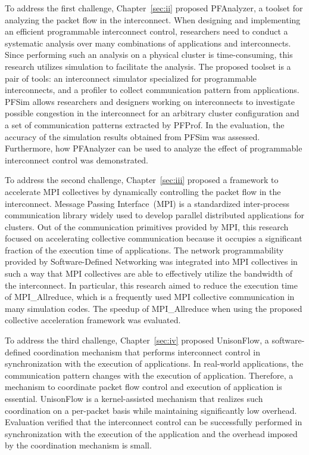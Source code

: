 To address the first challenge, Chapter~\ref{sec:ii} proposed PFAnalyzer, a
toolset for analyzing the packet flow in the interconnect. When designing and
implementing an efficient programmable interconnect control, researchers need
to conduct a systematic analysis over many combinations of applications and
interconnects. Since performing such an analysis on a physical cluster is
time-consuming, this research utilizes simulation to facilitate the analysis.
The proposed toolset is a pair of tools: an interconnect simulator
specialized for programmable interconnects, and a profiler to collect
communication pattern from applications. PFSim allows researchers and
designers working on interconnects to investigate possible congestion in the
interconnect for an arbitrary cluster configuration and a set of communication
patterns extracted by PFProf. In the evaluation, the accuracy of the
simulation results obtained from PFSim was assessed. Furthermore, how
PFAnalyzer can be used to analyze the effect of programmable interconnect
control was demonstrated.

To address the second challenge, Chapter~\ref{sec:iii} proposed a framework to
accelerate MPI collectives by dynamically controlling the packet flow in the
interconnect. Message Passing Interface~(MPI) is a standardized inter-process
communication library widely used to develop parallel distributed
applications for clusters. Out of the communication primitives provided by
MPI, this research focused on accelerating collective communication because it
occupies a significant fraction of the execution time of applications. The
network programmability provided by Software-Defined Networking was integrated
into MPI collectives in such a way that MPI collectives are able to
effectively utilize the bandwidth of the interconnect. In particular, this
research aimed to reduce the execution time of MPI\_Allreduce, which is a
frequently used MPI collective communication in many simulation codes. The
speedup of MPI\_Allreduce when using the proposed collective acceleration
framework was evaluated.

To address the third challenge, Chapter~\ref{sec:iv} proposed UnisonFlow, a
software-defined coordination mechanism that performs interconnect control in
synchronization with the execution of applications. In real-world
applications, the communication pattern changes with the execution of
application. Therefore, a mechanism to coordinate packet flow control and
execution of application is essential. UnisonFlow is a kernel-assisted
mechanism that realizes such coordination on a per-packet basis while
maintaining significantly low overhead. Evaluation verified that the
interconnect control can be successfully performed in synchronization with the
execution of the application and the overhead imposed by the coordination
mechanism is small.
